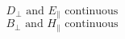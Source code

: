 \[ D_{\perp} \text{ and } E_{\parallel} \text{ continuous} \]
\[ B_{\perp} \text{ and } H_{\parallel} \text{ continuous} \]
